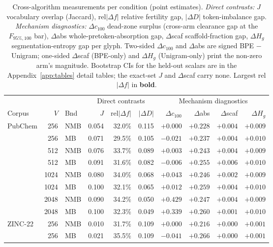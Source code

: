 \begin{table}[htbp]
  \centering
  \caption{Cross-algorithm measurements per condition (point estimates). \emph{Direct contrasts:} $J$ vocabulary overlap (Jaccard), rel$|\Delta f|$ relative fertility gap, $|\Delta D|$ token-imbalance gap. \emph{Mechanism diagnostics:} $\Delta c_{100}$ dead-zone surplus (cross-arm clearance gap at the $F_{95\%,100}$ bar), $\Delta$abs whole-pretoken-absorption gap, $\Delta$scaf scaffold-fraction gap, $\Delta H_g$ segmentation-entropy gap per glyph. Two-sided $\Delta c_{100}$ and $\Delta$abs are signed BPE $-$ Unigram; one-sided $\Delta$scaf (BPE-only) and $\Delta H_g$ (Unigram-only) print the non-zero arm's magnitude. Bootstrap CIs for the held-out scalars are in the Appendix~\ref{app:tables} detail tables; the exact-set $J$ and $\Delta$scaf carry none. Largest rel$|\Delta f|$ in \textbf{bold}.}
  \label{tab:results-seven}
  \footnotesize
  \begin{tabular}{@{}l r l r r r r r r r@{}}
    \toprule
    & & & \multicolumn{3}{c}{Direct contrasts} & \multicolumn{4}{c}{Mechanism diagnostics} \\
    \cmidrule(lr){4-6}\cmidrule(lr){7-10}
    Corpus & $V$ & Bnd & $J$ & rel$|\Delta f|$ & $|\Delta D|$ & $\Delta c_{100}$ & $\Delta$abs & $\Delta$scaf & $\Delta H_g$ \\
    \midrule
    PubChem & 256 & NMB & 0.054 & 32.0\% & 0.115 & $+0.000$ & $+0.228$ & $+0.004$ & $+0.009$ \\
     & 256 & MB & 0.071 & 29.5\% & 0.105 & $-0.021$ & $+0.237$ & $+0.004$ & $+0.010$ \\
     & 512 & NMB & 0.076 & 33.7\% & 0.089 & $+0.003$ & $+0.243$ & $+0.004$ & $+0.009$ \\
     & 512 & MB & 0.091 & 31.6\% & 0.082 & $-0.006$ & $+0.255$ & $+0.006$ & $+0.010$ \\
     & 1024 & NMB & 0.080 & 34.0\% & 0.068 & $+0.043$ & $+0.246$ & $+0.002$ & $+0.009$ \\
     & 1024 & MB & 0.100 & 32.1\% & 0.065 & $+0.012$ & $+0.259$ & $+0.004$ & $+0.010$ \\
     & 2048 & NMB & 0.090 & 34.2\% & 0.050 & $+0.429$ & $+0.247$ & $+0.004$ & $+0.009$ \\
     & 2048 & MB & 0.100 & 32.3\% & 0.049 & $+0.339$ & $+0.260$ & $+0.001$ & $+0.010$ \\
    \addlinespace
    ZINC-22 & 256 & NMB & 0.010 & 31.7\% & 0.109 & $+0.000$ & $+0.216$ & $+0.000$ & $+0.001$ \\
     & 256 & MB & 0.021 & 35.5\% & 0.109 & $-0.041$ & $+0.266$ & $+0.000$ & $+0.001$ \\

\end{tabular}
\end{table}
